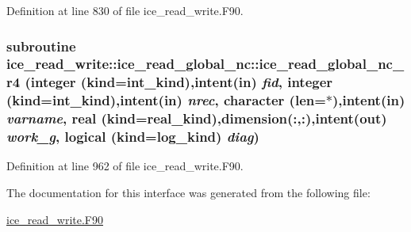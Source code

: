 Definition at line 830 of file ice\_\-read\_\-write.F90.\hypertarget{interfaceice__read__write_1_1ice__read__global__nc_ac044f68c44fe7f915c3761333ff38fa4}{
\subsubsection[{ice\_\-read\_\-global\_\-nc\_\-r4}]{\setlength{\rightskip}{0pt plus 5cm}subroutine ice\_\-read\_\-write::ice\_\-read\_\-global\_\-nc::ice\_\-read\_\-global\_\-nc\_\-r4 (integer (kind=int\_\-kind),intent(in) {\em fid}, \/  integer (kind=int\_\-kind),intent(in) {\em nrec}, \/  character (len=$\ast$),intent(in) {\em varname}, \/  real (kind=real\_\-kind),dimension(:,:),intent(out) {\em work\_\-g}, \/  logical (kind=log\_\-kind) {\em diag})}}
\label{interfaceice__read__write_1_1ice__read__global__nc_ac044f68c44fe7f915c3761333ff38fa4}


Definition at line 962 of file ice\_\-read\_\-write.F90.

The documentation for this interface was generated from the following file:\begin{DoxyCompactItemize}
\item 
\hyperlink{ice__read__write_8F90}{ice\_\-read\_\-write.F90}\end{DoxyCompactItemize}
